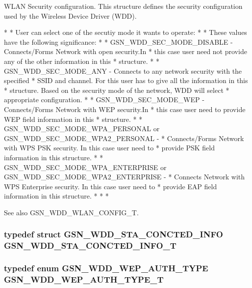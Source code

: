WLAN Security configuration. This structure defines the security configuration used by the Wireless Device Driver (WDD). 

\begin{DoxyVerb}
 *
 * User can select one of the secutiy mode it wants to operate:
 *
 *  These values have the following significance:
 *
 *  GSN_WDD_SEC_MODE_DISABLE - Connects/Forms Network with open security.In
 *  this case user need not provide any of the other information in this
 *  structure.
 *
 *  GSN_WDD_SEC_MODE_ANY - Connects to any network security with the specified
 *  SSID and channel. For this user has to give all the information in this
 *  structure. Based on the security mode of the network, WDD will select
 *  appropriate configuration.
 *
 *  GSN_WDD_SEC_MODE_WEP - Connects/Forms Network with WEP security.In
 *  this case user need to provide WEP field information in this
 *  structure.
 *
 *  GSN_WDD_SEC_MODE_WPA_PERSONAL or GSN_WDD_SEC_MODE_WPA2_PERSONAL -
 *  Connects/Forms Network with WPS PSK security. In this case user need to
 *  provide PSK field information in this structure.
 *
 *  GSN_WDD_SEC_MODE_WPA_ENTERPRISE or GSN_WDD_SEC_MODE_WPA2_ENTERPRISE -
 *  Connects Network with WPS Enterprise security. In this case user need to
 *  provide EAP field information in this structure.
 *
 *
 * \end{DoxyVerb}


\begin{DoxySeeAlso}{See also}
GSN\_\-WDD\_\-WLAN\_\-CONFIG\_\-T. 
\end{DoxySeeAlso}
\hypertarget{a00604_a59d65918cc1820c2c0edfb9df7202cfa}{
\subsubsection[{GSN\_\-WDD\_\-STA\_\-CONCTED\_\-INFO\_\-T}]{\setlength{\rightskip}{0pt plus 5cm}typedef struct {\bf GSN\_\-WDD\_\-STA\_\-CONCTED\_\-INFO} {\bf GSN\_\-WDD\_\-STA\_\-CONCTED\_\-INFO\_\-T}}}
\label{a00604_a59d65918cc1820c2c0edfb9df7202cfa}
\hypertarget{a00604_a6ac85e9527841d5a5c60fcd76a0c5100}{
\subsubsection[{GSN\_\-WDD\_\-WEP\_\-AUTH\_\-TYPE\_\-T}]{\setlength{\rightskip}{0pt plus 5cm}typedef enum {\bf GSN\_\-WDD\_\-WEP\_\-AUTH\_\-TYPE} {\bf GSN\_\-WDD\_\-WEP\_\-AUTH\_\-TYPE\_\-T}}}
\label{a00604_a6ac85e9527841d5a5c60fcd76a0c5100}


